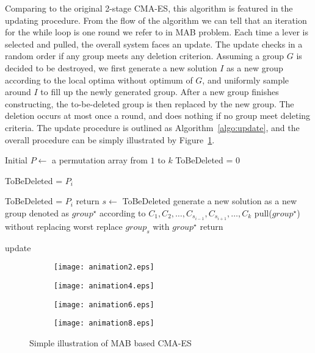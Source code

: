Comparing to the original 2-stage CMA-ES, this algorithm is featured in
the updating procedure.
From the flow of the algorithm we can tell that an iteration for the while
loop is one round we refer to in MAB problem.
Each time a lever is selected and pulled, the overall system faces an
update.
The update checks in a random order if any group meets any deletion
criterion.
Assuming a group $G$ is decided to be destroyed, we first generate a new
solution $I$ as a new group according to the local optima without
optimum of $G$, and uniformly sample around $I$ to fill up the newly
generated group.
After a new group finishes constructing, the to-be-deleted group is then
replaced by the new group.
The deletion occurs at most once a round, and does nothing if no group
meet deleting criteria.
The update procedure is outlined as Algorithm~\ref{algo:update}, and the
overall procedure can be simply illustrated by Figure~\ref{fig:animation}.
\begin{algorithm}
  Initial $P\leftarrow $ a permutation array from $1$ to $k$\; 
  ToBeDeleted = $0$\;
  {
    {
	    ToBeDeleted = $P_i$\; 
    }  

   }
   {
      {
        {
	        ToBeDeleted = $P_i$\;
        } 
      } 
    } 
    { 
      return\; 
    } 
    \Else
  	{ 
      $s\leftarrow$ ToBeDeleted\; 
      generate a new solution as a new group	denoted as $group^\star$ according to $C_1, C_2,\ldots, C_{s_{i-1}}, C_{s_{i+1}},\ldots, C_k$ \; 
      { pull($group^\star$) without replacing worst\; }
	replace $group_{s}$ with $group^\star$\; return\; 
} 
\caption{update}
\label{algo:update}
\end{algorithm}


\begin{figure}
\centering
\begin{subfigure}{.24\textwidth}
\texttt{[image: animation2.eps]}
\end{subfigure}
\begin{subfigure}{.24\textwidth}
\texttt{[image: animation4.eps]}
\end{subfigure}
\begin{subfigure}{.24\textwidth}
\texttt{[image: animation6.eps]}
\end{subfigure}
\begin{subfigure}{.24\textwidth}
\texttt{[image: animation8.eps]}
\end{subfigure}
\caption{Simple illustration of MAB based CMA-ES}
\label{fig:animation}
\end{figure}


